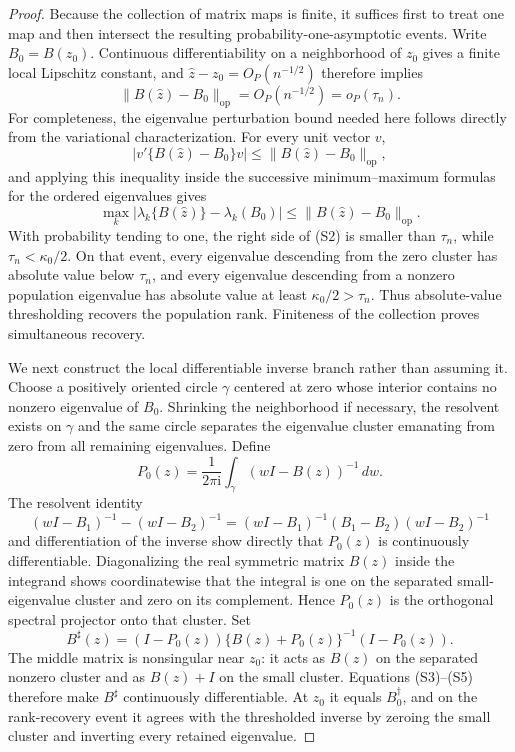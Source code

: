 \documentclass{article}
\begin{document}
\begin{proof}
Because the collection of matrix maps is finite, it suffices first to treat one map and then intersect the resulting probability-one-asymptotic events.  Write \(B_0=B(z_0)\).  Continuous differentiability on a neighborhood of \(z_0\) gives a finite local Lipschitz constant, and \(\widehat z-z_0=O_P(n^{-1/2})\) therefore implies
\[
 \|B(\widehat z)-B_0\|_{\mathrm{op}}=O_P(n^{-1/2})=o_P(\tau_n).
\tag{S1}
\]
For completeness, the eigenvalue perturbation bound needed here follows directly from the variational characterization.  For every unit vector \(v\),
\[
 |v'\{B(\widehat z)-B_0\}v|
 \le \|B(\widehat z)-B_0\|_{\mathrm{op}},
\]
and applying this inequality inside the successive minimum--maximum formulas for the ordered eigenvalues gives
\[
 \max_k|\lambda_k\{B(\widehat z)\}-\lambda_k(B_0)|
 \le \|B(\widehat z)-B_0\|_{\mathrm{op}}.
\tag{S2}
\]
With probability tending to one, the right side of (S2) is smaller than \(\tau_n\), while \(\tau_n<\kappa_0/2\).  On that event, every eigenvalue descending from the zero cluster has absolute value below \(\tau_n\), and every eigenvalue descending from a nonzero population eigenvalue has absolute value at least \(\kappa_0/2>\tau_n\).  Thus absolute-value thresholding recovers the population rank.  Finiteness of the collection proves simultaneous recovery.

We next construct the local differentiable inverse branch rather than assuming it.  Choose a positively oriented circle \(\gamma\) centered at zero whose interior contains no nonzero eigenvalue of \(B_0\).  Shrinking the neighborhood if necessary, the resolvent exists on \(\gamma\) and the same circle separates the eigenvalue cluster emanating from zero from all remaining eigenvalues.  Define
\[
 P_0(z)=\frac{1}{2\pi\mathrm i}\int_\gamma(wI-B(z))^{-1}\,dw.
\tag{S3}
\]
The resolvent identity
\[
 (wI-B_1)^{-1}-(wI-B_2)^{-1}
 =(wI-B_1)^{-1}(B_1-B_2)(wI-B_2)^{-1}
\tag{S4}
\]
and differentiation of the inverse show directly that \(P_0(z)\) is continuously differentiable.  Diagonalizing the real symmetric matrix \(B(z)\) inside the integrand shows coordinatewise that the integral is one on the separated small-eigenvalue cluster and zero on its complement.  Hence \(P_0(z)\) is the orthogonal spectral projector onto that cluster.  Set
\[
 B^\sharp(z)
 =(I-P_0(z))\{B(z)+P_0(z)\}^{-1}(I-P_0(z)).
\tag{S5}
\]
The middle matrix is nonsingular near \(z_0\): it acts as \(B(z)\) on the separated nonzero cluster and as \(B(z)+I\) on the small cluster.  Equations (S3)--(S5) therefore make \(B^\sharp\) continuously differentiable.  At \(z_0\) it equals \(B_0^\dagger\), and on the rank-recovery event it agrees with the thresholded inverse by zeroing the small cluster and inverting every retained eigenvalue.


\end{proof}
\end{document}
